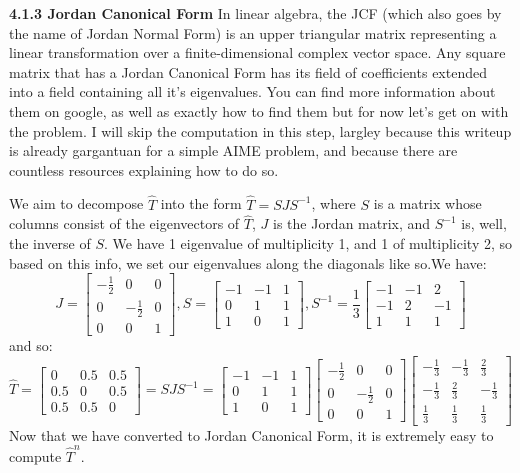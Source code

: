\begin{enumerate}
 \textbf{4.1.3 Jordan Canonical Form} In linear algebra, the JCF (which also goes by the name of Jordan Normal Form) is an upper triangular matrix representing a linear transformation over a finite-dimensional complex vector space. Any square matrix that has a Jordan Canonical Form has its field of coefficients extended into a field containing all it's eigenvalues. You can find more information about them on google, as well as exactly how to find them but for now let's get on with the problem. I will skip the computation in this step, largley because this writeup is already gargantuan for a simple AIME problem, and because there are countless resources explaining how to do so.

 We aim to decompose $\hat{T}$ into the form $\hat{T} = SJS^{-1}$, where $S$ is a matrix whose columns consist of the eigenvectors of $\hat{T}$, $J$ is the Jordan matrix, and $S^{-1}$ is, well, the inverse of $S$. We have 1 eigenvalue of multiplicity 1, and 1 of multiplicity 2, so based on this info, we set our eigenvalues along the diagonals like so.We have:
 \[J = \begin{bmatrix} -\frac{1}{2} & 0 & 0\\ 0 & -\frac{1}{2} & 0\\ 0 & 0 & 1 \end{bmatrix}, S = \begin{bmatrix} -1 & -1 & 1\\ 0 & 1 & 1\\ 1 & 0 & 1 \end{bmatrix}, S^{-1} = \frac{1}{3}\begin{bmatrix} -1 & -1 & 2\\ -1 & 2 & -1\\ 1 & 1 & 1 \end{bmatrix}\]and so:
 \[\hat{T} = \begin{bmatrix} 0 & 0.5 & 0.5\\ 0.5 & 0 & 0.5\\ 0.5 & 0.5 & 0 \end{bmatrix} = SJS^{-1} = \begin{bmatrix} -1 & -1 & 1\\ 0 & 1 & 1\\ 1 & 0 & 1 \end{bmatrix}\begin{bmatrix} -\frac{1}{2} & 0 & 0\\ 0 & -\frac{1}{2} & 0\\ 0 & 0 & 1 \end{bmatrix}\begin{bmatrix} -\frac{1}{3} & -\frac{1}{3} & \frac{2}{3}\\ -\frac{1}{3} & \frac{2}{3} & -\frac{1}{3}\\ \frac{1}{3} & \frac{1}{3} & \frac{1}{3} \end{bmatrix}\]Now that we have converted to Jordan Canonical Form, it is extremely easy to compute $\hat{T}^n$.


\end{enumerate}
